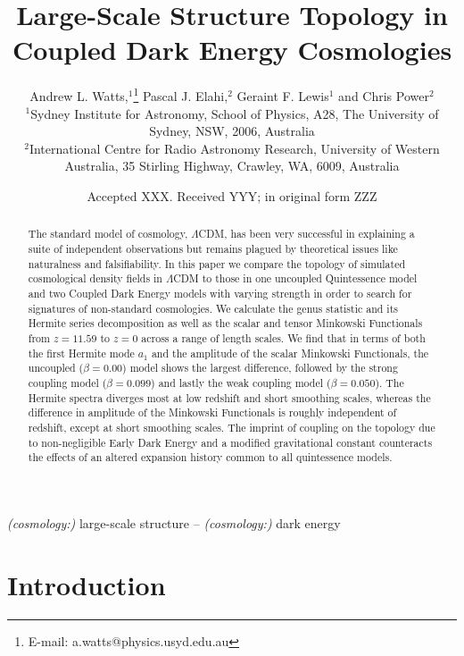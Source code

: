 \documentclass[a4paper,fleqn,usenatbib]{mnras}
\title[Topology in Coupled Dark Energy Models]{Large-Scale Structure Topology in Coupled Dark Energy Cosmologies}
\author[A. L. Watts et al.]{
Andrew L. Watts,$^{1}$\thanks{E-mail: a.watts@physics.usyd.edu.au}
Pascal J. Elahi,$^{2}$
Geraint F. Lewis$^{1}$
and Chris Power$^{2}$
\\
$^{1}$Sydney Institute for Astronomy, School of Physics, A28, The University of Sydney, NSW, 2006, Australia \\
$^{2}$International Centre for Radio Astronomy Research, University of Western Australia, 35 Stirling Highway, Crawley, WA, 6009, Australia
}
\date{Accepted XXX. Received YYY; in original form ZZZ}
\begin{document}
\label{firstpage}
\pagerange{\pageref{firstpage}--\pageref{lastpage}}
\maketitle

\begin{abstract}
The standard model of cosmology, $\Lambda$CDM, has been very successful in explaining a suite of independent observations but remains plagued by theoretical issues like naturalness and falsifiability. In this paper we compare the topology of simulated cosmological density fields in $\Lambda$CDM to those in one uncoupled Quintessence model and two Coupled Dark Energy models with varying strength in order to search for signatures of non-standard cosmologies. We calculate the genus statistic and its Hermite series decomposition as well as the scalar and tensor Minkowski Functionals from $z=11.59$ to $z=0$ across a range of length scales. We find that in terms of both the first Hermite mode $a_1$ and the amplitude of the scalar Minkowski Functionals, the uncoupled ($\beta=0.00$) model shows the largest difference, followed by the strong coupling model ($\beta=0.099$) and lastly the weak coupling model ($\beta=0.050$). The Hermite spectra diverges most at low redshift and short smoothing scales, whereas the difference in amplitude of the Minkowski Functionals is roughly independent of redshift, except at short smoothing scales. The imprint of coupling on the topology due to non-negligible Early Dark Energy and a modified gravitational constant counteracts the effects of an altered expansion history common to all quintessence models.
\end{abstract}

\begin{keywords}
\textit{(cosmology:)} large-scale structure -- \textit{(cosmology:)} dark energy
\end{keywords}



\section{Introduction}
\end{document}
